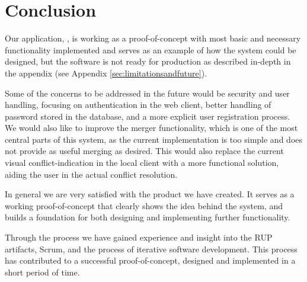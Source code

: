 \section{Conclusion}
Our application, \SOP{}, is working as a proof-of-concept with most basic and necessary functionality implemented and serves as an example of how the system could be designed, but the software is not ready for production as described in-depth in the appendix (see Appendix \ref{sec:limitationsandfuture}).

Some of the concerns to be addressed in the future would be security and user handling, focusing on authentication in the web client, better handling of password stored in the database, and a more explicit user registration process. We would also like to improve the merger functionality, which is one of the most central parts of this system, as the current implementation is too simple and does not provide as useful merging as desired. This would also replace the current visual conflict-indication in the local client with a more functional solution, aiding the user in the actual conflict resolution.

In general we are very satisfied with the product we have created. It serves as a working proof-of-concept that clearly shows the idea behind the \SOP{} system, and builds a foundation for both designing and implementing further functionality. 

Through the process we have gained experience and insight into the RUP artifacts, Scrum, and the process of iterative software development. This process has contributed to a successful proof-of-concept, designed and implemented in a short period of time.
